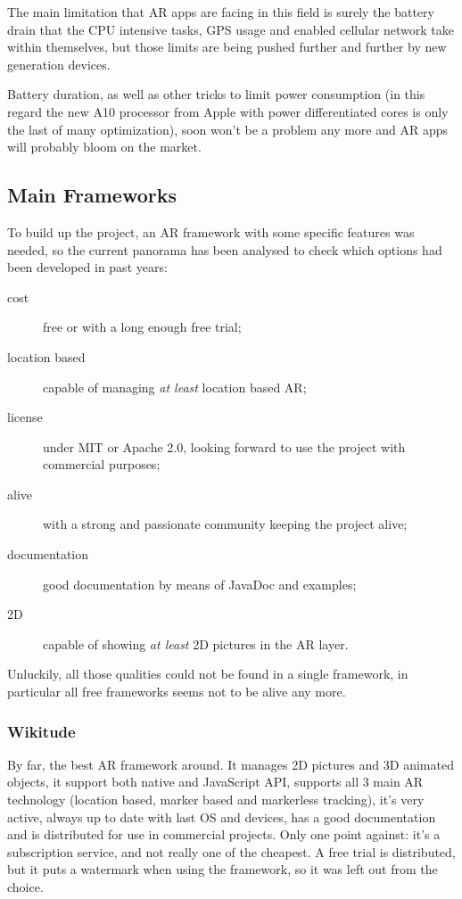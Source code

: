 		The main limitation that AR apps are facing in this field is surely the battery drain that the CPU intensive tasks, GPS usage and enabled cellular network take within themselves, but those limits are being pushed further and further by new generation devices.
		
		Battery duration, as well as other tricks to limit power consumption (in this regard the new A10 processor from Apple with power differentiated cores is only the last of many optimization), soon won't be a problem any more and AR apps will probably bloom on the market.
		
		\subsection{Main Frameworks}
			
			To build up the project, an AR framework with some specific features was needed, so the current panorama has been analysed to check which options had been developed in past years:
			
			\begin{description}
				\item[cost] free or with a long enough free trial;
				\item[location based] capable of managing \emph{at least} location based AR;
				\item[license] under MIT or Apache 2.0, looking forward to use the project with commercial purposes;
				\item[alive] with a strong and passionate community keeping the project alive;
				\item[documentation] good documentation by means of JavaDoc and examples;
				\item[2D] capable of showing \emph{at least} 2D pictures in the AR layer.
			\end{description}
			
			Unluckily, all those qualities could not be found in a single framework, in particular all free frameworks seems not to be alive any more.
			
			\subsubsection{Wikitude}
			
				By far, the best AR framework around. It manages 2D pictures and 3D animated objects, it support both native and JavaScript API, supports all 3 main AR technology (location based, marker based and markerless tracking), it's very active, always up to date with last OS and devices, has a good documentation and is distributed for use in commercial projects.
				Only one point against: it's a subscription service, and not really one of the cheapest.
				A free trial is distributed, but it puts a watermark when using the framework, so it was left out from the choice.
			
